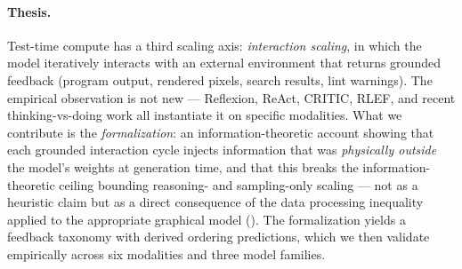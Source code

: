 \documentclass[11pt]{article}
\begin{document}
\paragraph{Thesis.} Test-time compute has a third scaling axis: \emph{interaction scaling}, in which the model iteratively interacts with an external environment that returns grounded feedback (program output, rendered pixels, search results, lint warnings). The empirical observation is not new --- Reflexion, ReAct, CRITIC, RLEF, and recent thinking-vs-doing work all instantiate it on specific modalities. What we contribute is the \emph{formalization}: an information-theoretic account showing that each grounded interaction cycle injects information that was \emph{physically outside} the model's weights at generation time, and that this breaks the information-theoretic ceiling bounding reasoning- and sampling-only scaling --- not as a heuristic claim but as a direct consequence of the data processing inequality applied to the appropriate graphical model (). The formalization yields a feedback taxonomy with derived ordering predictions, which we then validate empirically across six modalities and three model families.
\end{document}
